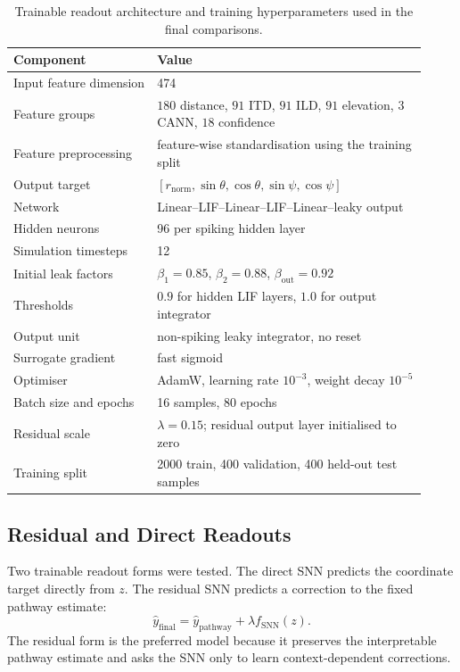 \begin{table}[H]
\centering
\caption{Trainable readout architecture and training hyperparameters used in the final comparisons.}
\label{tab:trainable_snn_architecture}
\begin{tabular}{p{0.32\linewidth}p{0.60\linewidth}}
\toprule
Component & Value \\
\midrule
Input feature dimension & 474 \\
Feature groups & $180$ distance, $91$ ITD, $91$ ILD, $91$ elevation, $3$ CANN, $18$ confidence \\
Feature preprocessing & feature-wise standardisation using the training split \\
Output target & $[r_{\mathrm{norm}}, \sin\theta, \cos\theta, \sin\psi, \cos\psi]$ \\
Network & Linear--LIF--Linear--LIF--Linear--leaky output \\
Hidden neurons & 96 per spiking hidden layer \\
Simulation timesteps & 12 \\
Initial leak factors & $\beta_1=0.85$, $\beta_2=0.88$, $\beta_{\mathrm{out}}=0.92$ \\
Thresholds & $0.9$ for hidden LIF layers, $1.0$ for output integrator \\
Output unit & non-spiking leaky integrator, no reset \\
Surrogate gradient & fast sigmoid \\
Optimiser & AdamW, learning rate $10^{-3}$, weight decay $10^{-5}$ \\
Batch size and epochs & 16 samples, 80 epochs \\
Residual scale & $\lambda=0.15$; residual output layer initialised to zero \\
Training split & 2000 train, 400 validation, 400 held-out test samples \\
\bottomrule
\end{tabular}
\end{table}

\subsection{Residual and Direct Readouts}

Two trainable readout forms were tested. The direct SNN predicts the coordinate target directly from $z$. The residual SNN predicts a correction to the fixed pathway estimate:
\begin{equation}
    \hat{y}_{\mathrm{final}}
    =
    \hat{y}_{\mathrm{pathway}}
    +
    \lambda f_{\mathrm{SNN}}(z).
\end{equation}
The residual form is the preferred model because it preserves the interpretable pathway estimate and asks the SNN only to learn context-dependent corrections.

